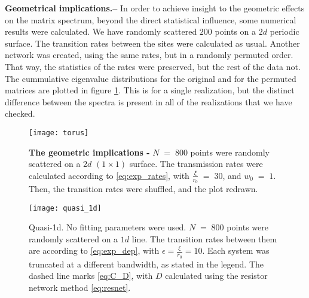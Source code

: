 \documentclass[onecolumn,fleqn,notitlepage,secnumarabic]{revtex4}
\begin{document}
{ \bf Geometrical implications.-- } In order to achieve insight to the geometric effects on the matrix spectrum, beyond the direct statistical influence, some numerical results were calculated. We have randomly scattered $200$ points on a $2d$ periodic surface. The transition rates between the sites were calculated as usual. Another network was created, using the same rates, but in a randomly permuted order. That way, the statistics of the rates were preserved, but the rest of the data not. The cummulative eigenvalue distributions for the original and for the permuted matrices are plotted in figure \ref{fig:torus}. This is for a single realization, but the distinct difference between the spectra is present in all of the realizations that we have checked.

\begin{figure}
    \texttt{[image: torus]}
    \caption{{ \bf The geometric implications -} $N\;=\;800$ points were randomly scattered on a $2d$ $(1\times 1)$ surface. The transmission rates were calculated according to \eqref{eq:exp_rates}, with $\frac{\xi}{r_0} \;=\; 30$, and $w_0\;=\;1$. Then, the transition rates were shuffled, and the plot redrawn.}
    \label{fig:torus}
\end{figure}



\begin{figure}
    \texttt{[image: quasi\_1d]}
    \caption{Quasi-1d. No fitting parameters were used. $N\;=\;800$ points were randomly scattered on a $1d$ line. The transition rates between them are according to \eqref{eq:exp_dep}, with $\epsilon=\frac{\xi}{r_0}=10$. Each system was truncated at a different bandwidth, as stated in the legend. The dashed line marks \eqref{eq:C_D}, with $D$ calculated using the resistor network method \eqref{eq:resnet}. }
    \label{fig:quasi_1d}
\end{figure}
\end{document}
